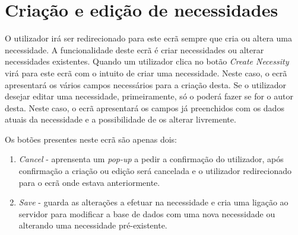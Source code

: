 \chapter{Criação e edição de necessidades}\label{cap:necessityCreation}

O utilizador irá ser redirecionado para este ecrã sempre que cria ou altera uma necessidade.
A funcionalidade deste ecrã é criar necessidades ou alterar necessidades existentes.
Quando um utilizador clica no botão \textit{Create Necessity} virá para este ecrã com o intuito de criar uma necessidade.
Neste caso, o ecrã apresentará os vários campos necessários para a criação desta.
Se o utilizador desejar editar uma necessidade, primeiramente, só o poderá fazer se for o autor desta.
Neste caso, o ecrã apresentará os campos já preenchidos com os dados atuais da necessidade e a possibilidade de os alterar livremente.

Os botões presentes neste ecrã são apenas dois:
\begin{enumerate}
    \item \textit{Cancel} - aprensenta um \textit{pop-up} a pedir a confirmação do utilizador, após confirmação a criação ou edição será cancelada e o utilizador redirecionado para o ecrã onde estava anteriormente.
    \item \textit{Save} - guarda as alterações a efetuar na necessidade e cria uma ligação ao servidor para modificar a base de dados com uma nova necessidade ou alterando uma necessidade pré-existente.
\end{enumerate}